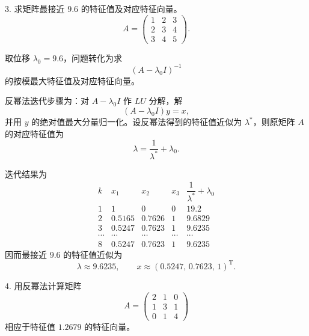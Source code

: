 \documentclass[11pt, a4paper]{ctexart}
\begin{document}
\begin{problem}{3. 求矩阵最接近 $9.6$ 的特征值及对应特征向量。}
    \[
        A =
        \begin{pmatrix}
            1 & 2 & 3 \\
            2 & 3 & 4 \\
            3 & 4 & 5
        \end{pmatrix}.
    \]
\end{problem}

\begin{solution}
    取位移 $\lambda_0=9.6$，问题转化为求
    \[
        (A-\lambda_0 I)^{-1}
    \]
    的按模最大特征值及对应特征向量。

    反幂法迭代步骤为：对 $A-\lambda_0 I$ 作 $LU$ 分解，解
    \[
        (A-\lambda_0 I)y = x,
    \]
    并用 $y$ 的绝对值最大分量归一化。设反幂法得到的特征值近似为 $\lambda^\ast$，则原矩阵 $A$ 的对应特征值为
    \[
        \lambda = \frac{1}{\lambda^\ast}+\lambda_0.
    \]

    迭代结果为
    \[
        \renewcommand{\arraystretch}{1.15}
        \begin{array}{c|rrrr}
            k & x_1 & x_2 & x_3 & \dfrac{1}{\lambda^\ast}+\lambda_0 \\ \hline
            1 & 1 & 0 & 0 & 19.2 \\
            2 & 0.5165 & 0.7626 & 1 & 9.6829 \\
            3 & 0.5247 & 0.7623 & 1 & 9.6235 \\
            \cdots & \cdots & \cdots & \cdots & \cdots \\
            8 & 0.5247 & 0.7623 & 1 & 9.6235
        \end{array}
    \]
    因而最接近 $9.6$ 的特征值近似为
    \[
        \lambda \approx 9.6235,
        \qquad
        x \approx (0.5247,\,0.7623,\,1)^{\mathrm{T}}.
    \]
\end{solution}


\begin{problem}{4. 用反幂法计算矩阵}
    \[
        A =
        \begin{pmatrix}
            2 & 1 & 0 \\
            1 & 3 & 1 \\
            0 & 1 & 4
        \end{pmatrix}
    \]
    相应于特征值 $1.2679$ 的特征向量。
\end{problem}
\end{document}
